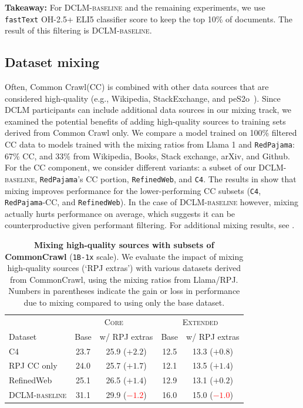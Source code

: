 \documentclass{article}
\newcommand{\takeawaybox}[1]{
  \begin{tcolorbox}[
    colback=blue!10,
    colframe=blue!50,
    boxrule=0.5pt,
    arc=0mm,
    left=5pt,
    right=5pt,
    top=2pt,
    bottom=2pt,
    fontupper={\fontsize{9.5pt}{11.75pt}\selectfont}
  ]
    \textbf{Takeaway:} #1
  \end{tcolorbox}
  \vspace*{-0.1cm}
}
\newcommand{\hqpool}{\textsc{DCLM-baseline}\xspace}
\newcommand{\oh}{\textsc{OH-2.5}\xspace}
\newcommand{\strack}{\texttt{1B-1x}\xspace}
\newcommand{\cfour}{\texttt{C4}\xspace}
\newcommand{\rpj}{\texttt{RedPajama}\xspace}
\newcommand{\rw}{\texttt{RefinedWeb}\xspace}
\newcommand{\fasttext}{\texttt{fastText}\xspace}
\newcommand{\llama}{Llama\xspace}
\newcommand{\lowvar}{\textsc{Core}\xspace}
\newcommand{\aggscore}{\textsc{Extended}\xspace}
\newcommand{\commoncrawl}{Common Crawl\xspace}
\begin{document}
\takeawaybox{For \hqpool{} and the remaining experiments, we use \fasttext{} \oh + ELI5 classifier score to keep the top 10\% of documents. The result of this filtering is \hqpool{}.}

\subsection{Dataset mixing}
\label{sec:mixing}
Often, \commoncrawl (CC) is combined with other data sources that are considered high-quality \citep{rpj, pile, openwebtext, llama2} (e.g., Wikipedia, StackExchange, and peS2o~\citep{peS2o}).
Since DCLM participants can include additional data sources in our mixing track, we examined the potential benefits of adding high-quality sources to training sets derived from \commoncrawl only.
We compare a model trained on 100\% filtered CC data to models trained with the mixing ratios from \llama 1 and \rpj: 67\% CC, and 33\% from Wikipedia, Books, Stack exchange, arXiv, and Github.
For the CC component, we consider different variants: a subset of our \hqpool, \rpj's CC portion, \rw, and \cfour.
The results in  show that mixing improves performance for the lower-performing CC subsets (\cfour, \rpj-CC, and \rw).
In the case of \hqpool however, mixing actually hurts performance on average, which suggests it can be counterproductive given performant filtering.
For additional mixing results, see .

\begin{table}[ht]
\centering
\caption{\textbf{Mixing high-quality sources with subsets of CommonCrawl} (\strack{} scale). We evaluate the impact of mixing high-quality sources (`RPJ extras') with various datasets derived from CommonCrawl, using the mixing ratios from \llama/RPJ. Numbers in parentheses indicate the gain or loss in performance due to mixing compared to using only the base dataset.}
\label{tab:mixing_cc}
\begin{tabular}{lcccc}
\toprule
& \multicolumn{2}{c}{\lowvar} & \multicolumn{2}{c}{\aggscore} \\
     Dataset & Base &                         w/ RPJ extras & Base &                      w/ RPJ extras \\
\midrule
          C4 & 23.7 & 25.9 (\textcolor{nicergreen}{$+2.2$}) &    12.5 & 13.3 (\textcolor{nicergreen}{$+0.8$}) \\
 RPJ CC only & 24.0 & 25.7 (\textcolor{nicergreen}{$+1.7$}) &    12.1 & 13.5 (\textcolor{nicergreen}{$+1.4$}) \\
  RefinedWeb & 25.1 & 26.5 (\textcolor{nicergreen}{$+1.4$}) &    12.9 & 13.1 (\textcolor{nicergreen}{$+0.2$}) \\
\hqpool & 31.1 &        29.9 (\textcolor{red}{$-1.2$}) &    16.0 &        15.0 (\textcolor{red}{$-1.0$}) \\\bottomrule
\end{tabular}

\end{table}
\end{document}

